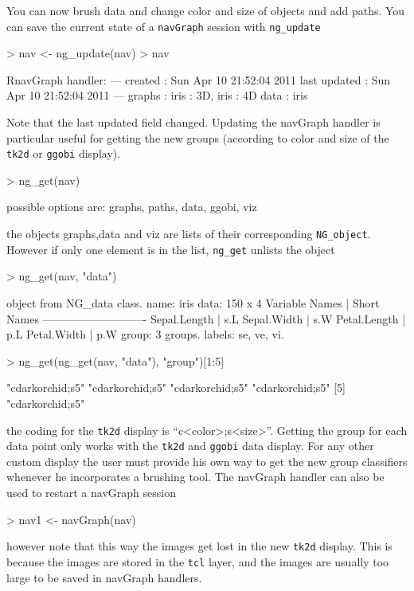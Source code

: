 \documentclass[12pt,oneside,titlepage,letter]{article}
\begin{document}
You can now brush data and change color and size of objects and add paths. You can save the current state of a \texttt{navGraph} session with \texttt{ng\_update}
\begin{Schunk}
\begin{Sinput}
> nav <- ng_update(nav)
> nav
\end{Sinput}
\begin{Soutput}
RnavGraph handler:
---
created       : Sun Apr 10 21:52:04 2011 
last updated  : Sun Apr 10 21:52:04 2011 
---
graphs        : iris : 3D, iris : 4D 
data          : iris 
\end{Soutput}
\end{Schunk}
Note that the last updated field changed. Updating the navGraph handler is particular useful for getting the new groups (according to color and size of the \texttt{tk2d} or \texttt{ggobi} display).
\begin{Schunk}
\begin{Sinput}
> ng_get(nav)
\end{Sinput}
\begin{Soutput}
possible options are: graphs, paths, data, ggobi, viz
\end{Soutput}
\end{Schunk}
the objects graphs,data and viz are lists of their corresponding \texttt{NG\_object}. However if only one element is in the list, \texttt{ng\_get} unlists the object
\begin{Schunk}
\begin{Sinput}
> ng_get(nav, "data")
\end{Sinput}
\begin{Soutput}
object from NG_data class.
  name: iris 
  data: 150 x 4 
    Variable Names | Short Names
    ----------------------------
    Sepal.Length   | s.L
    Sepal.Width    | s.W
    Petal.Length   | p.L
    Petal.Width    | p.W
  group:  3 groups.
  labels: se, ve, vi. 
\end{Soutput}
\begin{Sinput}
> ng_get(ng_get(nav, "data"), "group")[1:5]
\end{Sinput}
\begin{Soutput}
[1] "cdarkorchid;s5" "cdarkorchid;s5" "cdarkorchid;s5" "cdarkorchid;s5"
[5] "cdarkorchid;s5"
\end{Soutput}
\end{Schunk}
the coding for the \texttt{tk2d} display is ``c<color>;s<size>''. Getting the group for each data point only works with the \texttt{tk2d} and \texttt{ggobi} data display. For any other custom display the user must provide his own way to get the new group classifiers whenever he incorporates a brushing tool. The navGraph handler can also be used to restart a navGraph session
\begin{Schunk}
\begin{Sinput}
> nav1 <- navGraph(nav)
\end{Sinput}
\end{Schunk}
however note that this way the images get lost in the new \texttt{tk2d} display. This is because the images are stored in the \texttt{tcl} layer, and the images are usually too large to be saved in navGraph handlers.\\
\end{document}
